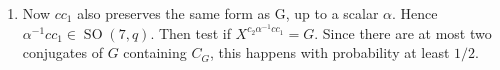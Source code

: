 \documentclass[twoside,a4paper,reqno,psamsfonts]{amsart}
\numberwithin{equation}{section}
\numberwithin{figure}{section}
\theoremstyle{plain}
\theoremstyle{definition}
\theoremstyle{remark}
\DeclareMathOperator{\SO}{SO}
\begin{document}
\begin{enumerate}
\item Now $c c_1$ also preserves the same form as G, up to a scalar
  $\alpha$. Hence $\alpha^{-1} c c_1 \in \SO(7, q)$. Then test if
  $X^{c_2 \alpha^{-1} c c_1} = G$. Since there are at most two
  conjugates of $G$ containing $C_G$, this happens with probability at
  least $1/2$.

\end{enumerate}





\end{document}
